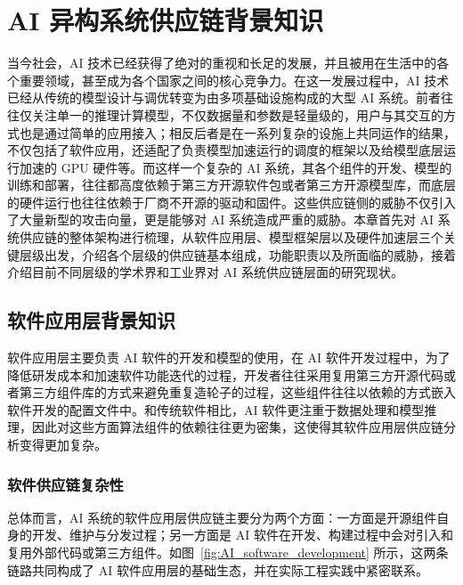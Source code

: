 \chapter{AI 异构系统供应链背景知识}
当今社会，AI 技术已经获得了绝对的重视和长足的发展，并且被用在生活中的各个重要领域，甚至成为各个国家之间的核心竞争力。在这一发展过程中，AI 技术已经从传统的模型设计与调优转变为由多项基础设施构成的大型 AI 系统。前者往往仅关注单一的推理计算模型，不仅数据量和参数是轻量级的，用户与其交互的方式也是通过简单的应用接入；相反后者是在一系列复杂的设施上共同运作的结果，不仅包括了软件应用，还适配了负责模型加速运行的调度的框架以及给模型底层运行加速的 GPU 硬件等。而这样一个复杂的 AI 系统，其各个组件的开发、模型的训练和部署，往往都高度依赖于第三方开源软件包或者第三方开源模型库，而底层的硬件运行也往往依赖于厂商不开源的驱动和固件。这些供应链侧的威胁不仅引入了大量新型的攻击向量，更是能够对 AI 系统造成严重的威胁。本章首先对 AI 系统供应链的整体架构进行梳理，从软件应用层、模型框架层以及硬件加速层三个关键层级出发，介绍各个层级的供应链基本组成，功能职责以及所面临的威胁，接着介绍目前不同层级的学术界和工业界对 AI 系统供应链层面的研究现状。

\section{软件应用层背景知识}
软件应用层主要负责 AI 软件的开发和模型的使用，在 AI 软件开发过程中，为了降低研发成本和加速软件功能迭代的过程，开发者往往采用复用第三方开源代码或者第三方组件库的方式来避免重复造轮子的过程，这些组件往往以依赖的方式嵌入软件开发的配置文件中。和传统软件相比，AI 软件更注重于数据处理和模型推理，因此对这些方面算法组件的依赖往往更为密集，这使得其软件应用层供应链分析变得更加复杂。

\subsection{软件供应链复杂性}
总体而言，AI 系统的软件应用层供应链主要分为两个方面：一方面是开源组件自身的开发、维护与分发过程；另一方面是 AI 软件在开发、构建过程中会对引入和复用外部代码或第三方组件。如图~\ref{fig:AI_software_development} 所示，这两条链路共同构成了 AI 软件应用层的基础生态，并在实际工程实践中紧密联系。

